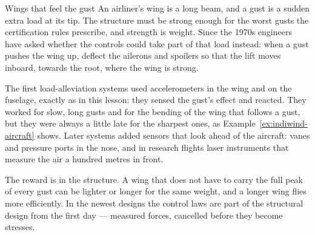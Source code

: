 \begin{curiosity}{Wings that feel the gust}
An airliner's wing is a long beam, and a gust is a sudden extra load at its tip. The structure must be strong enough for the worst gusts the certification rules prescribe, and strength is weight. Since the 1970s engineers have asked whether the controls could take part of that load instead: when a gust pushes the wing up, deflect the ailerons and spoilers so that the lift moves inboard, towards the root, where the wing is strong.

The first load-alleviation systems used accelerometers in the wing and on the fuselage, exactly as in this lesson: they sensed the gust's effect and reacted. They worked for slow, long gusts and for the bending of the wing that follows a gust, but they were always a little late for the sharpest ones, as Example~\ref{ex:indiwind-aircraft} shows. Later systems added sensors that look ahead of the aircraft: vanes and pressure ports in the nose, and in research flights laser instruments that measure the air a hundred metres in front.

The reward is in the structure. A wing that does not have to carry the full peak of every gust can be lighter or longer for the same weight, and a longer wing flies more efficiently. In the newest designs the control laws are part of the structural design from the first day — measured forces, cancelled before they become stresses.
\end{curiosity}


